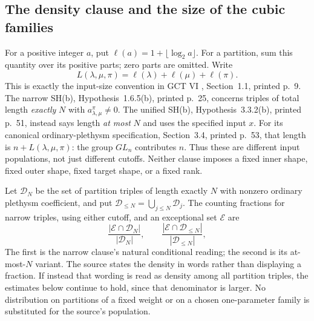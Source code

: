 \subsection{The density clause and the size of the cubic families}
\label{sec:cubicdensityscope}

\begin{proposition}
\label{prop:cubicdensityscope}
For a positive integer $a$, put
$\ell(a)=1+\lfloor\log_2a\rfloor$. For a partition, sum this
quantity over its positive parts; zero parts are omitted.
Write
\[
 L(\lambda,\mu,\pi)=\ell(\lambda)+\ell(\mu)+\ell(\pi).
\]
This is exactly the input-size convention in GCT VI \cite{PGCTVI},
Section~1.1, printed p.~9. The narrow SH(b), Hypothesis~1.6.5(b),
printed p.~25, concerns triples of total length \emph{exactly}
$N$ with $a_{\lambda,\mu}^{\pi}\ne0$. The unified SH(b),
Hypothesis~3.3.2(b), printed p.~51, instead says length
\emph{at most} $N$ and uses the specified input $x$.
For its canonical ordinary-plethysm specification,
Section~3.4, printed p.~53, that length is
$n+L(\lambda,\mu,\pi)$: the group $GL_n$ contributes $n$.
Thus these are different input populations, not just
different cutoffs. Neither clause imposes a fixed inner
shape, fixed outer shape, fixed target shape, or a fixed rank.

Let $\mathcal D_N$ be the set of partition triples of length
exactly $N$ with nonzero ordinary plethysm coefficient, and
put $\mathcal D_{\le N}=\bigcup_{j\le N}\mathcal D_j$.
The counting fractions for narrow triples, using either cutoff,
and an exceptional set
$\mathcal E$ are
\[
 \frac{|\mathcal E\cap\mathcal D_N|}{|\mathcal D_N|},
 \qquad
 \frac{|\mathcal E\cap\mathcal D_{\le N}|}
      {|\mathcal D_{\le N}|},
 \tag{P-F48a}
\]
The first is the narrow clause's natural
conditional reading; the second is its at-most-$N$ variant.
The source states the density in words rather than displaying
a fraction. If instead that wording is read
as density among all partition triples, the estimates below
continue to hold, since that denominator is larger. No
distribution on partitions of a fixed weight or on a chosen
one-parameter family is substituted for the source's population.


\end{proposition}
